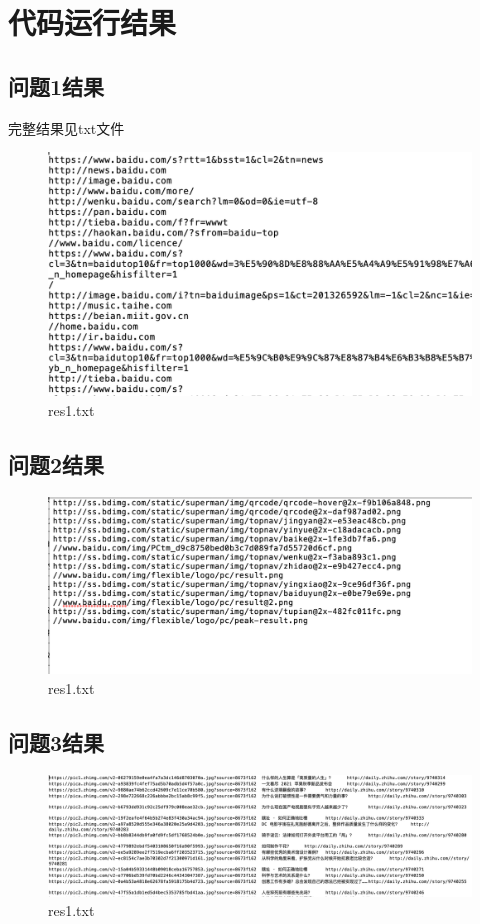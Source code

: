 \documentclass[12pt,a4paper]{article}
\begin{document}
\section{代码运行结果}
\subsection{问题1结果}
完整结果见txt文件
\begin{figure}[H]
	\includegraphics[scale=0.7]{res1.png}
	 \caption{res1.txt}
\end{figure}

\subsection{问题2结果}
\begin{figure}[H]
	\includegraphics[scale=0.7]{res2.png}
	 \caption{res1.txt}
\end{figure}

\subsection{问题3结果}
\begin{figure}[H]
	\includegraphics[scale=0.7]{res3.png}
	 \caption{res1.txt}
\end{figure}
\end{document}
